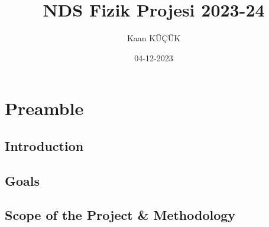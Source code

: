 \documentclass[12pt]{article}
\title{NDS Fizik Projesi 2023-24}
\date{04-12-2023}
\author{Kaan KÜÇÜK}
\begin{document}
\maketitle
\newpage
{}

\section{Preamble}

    \subsection{Introduction}

    \subsection{Goals}

    \subsection{Scope of the Project & Methodology}
\end{document}
